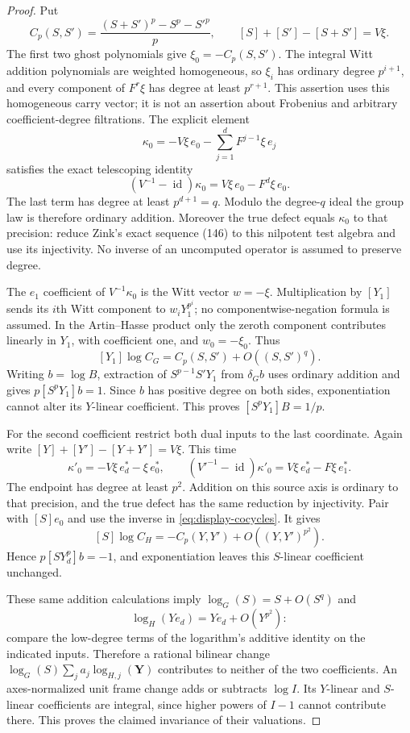 \documentclass[11pt,a4paper]{article}
\theoremstyle{definition}\newtheorem{remark}[theorem]{Remark}
\newcommand{\id}{\operatorname{id}}\newcommand{\Hom}{\operatorname{Hom}}
\begin{document}
\begin{proof}
Put
\[
 C_p(S,S')=\frac{(S+S')^p-S^p-S'^p}{p},\qquad
 [S]+[S']-[S+S']=V\xi.
\]
The first two ghost polynomials give $\xi_0=-C_p(S,S')$. The integral Witt addition polynomials are weighted homogeneous, so $\xi_i$ has ordinary degree $p^{i+1}$, and every component of $F^r\xi$ has degree at least $p^{r+1}$. This assertion uses this homogeneous carry vector; it is not an assertion about Frobenius and arbitrary coefficient-degree filtrations. The explicit element
\[
 \kappa_0=-V\xi\,e_0-\sum_{j=1}^dF^{j-1}\xi\,e_j
\]
satisfies the exact telescoping identity
\[
 (V^{-1}-\id)\kappa_0=V\xi\,e_0-F^d\xi\,e_0.
\]
The last term has degree at least $p^{d+1}=q$. Modulo the degree-$q$ ideal the group law is therefore ordinary addition. Moreover the true defect equals $\kappa_0$ to that precision: reduce Zink's exact sequence (146) to this nilpotent test algebra and use its injectivity. No inverse of an uncomputed operator is assumed to preserve degree.

The $e_1$ coefficient of $V^{-1}\kappa_0$ is the Witt vector $w=-\xi$. Multiplication by $[Y_1]$ sends its $i$th Witt component to $w_iY_1^{p^i}$; no componentwise-negation formula is assumed. In the Artin--Hasse product only the zeroth component contributes linearly in $Y_1$, with coefficient one, and $w_0=-\xi_0$. Thus
\[
 [Y_1]\log C_G=C_p(S,S')+O((S,S')^q).
\]
Writing $b=\log B$, extraction of $S^{p-1}S'Y_1$ from $\delta_G b$ uses ordinary addition and gives $p[S^pY_1]b=1$. Since $b$ has positive degree on both sides, exponentiation cannot alter its $Y$-linear coefficient. This proves $[S^pY_1]B=1/p$.

For the second coefficient restrict both dual inputs to the last coordinate. Again write $[Y]+[Y']-[Y+Y']=V\xi$. This time
\[
 \kappa'_0=-V\xi\,e_d^*-\xi\,e_0^*,\qquad
 (V'^{-1}-\id)\kappa'_0=V\xi\,e_d^*-F\xi\,e_1^*.
\]
The endpoint has degree at least $p^2$. Addition on this source axis is ordinary to that precision, and the true defect has the same reduction by injectivity. Pair with $[S]e_0$ and use the inverse in \eqref{eq:display-cocycles}. It gives
\[
 [S]\log C_H=-C_p(Y,Y')+O((Y,Y')^{p^2}).
\]
Hence $p[SY_d^p]b=-1$, and exponentiation leaves this $S$-linear coefficient unchanged.

These same addition calculations imply $\log_G(S)=S+O(S^q)$ and
\[
 \log_H(Ye_d)=Ye_d+O(Y^{p^2}):
\]
compare the low-degree terms of the logarithm's additive identity on the indicated inputs. Therefore a rational bilinear change $\log_G(S)\sum_j a_j\log_{H,j}(\mathbf Y)$ contributes to neither of the two coefficients. An axes-normalized unit frame change adds or subtracts $\log I$. Its $Y$-linear and $S$-linear coefficients are integral, since higher powers of $I-1$ cannot contribute there. This proves the claimed invariance of their valuations.


\end{proof}
\end{document}

